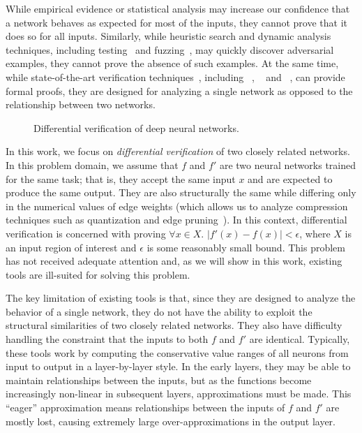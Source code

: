 While empirical evidence or statistical analysis may increase our
confidence that a network behaves as expected for most of the inputs,
they cannot prove that it does so for all inputs.
%
Similarly, while heuristic search and dynamic analysis techniques,
including testing~\cite{PeiCYJ17, TianPJR18, ma2018deepgauge} and
fuzzing~\cite{odena2018tensorfuzz, xie2019deephunter, xie2019diffchaser}, may quickly discover adversarial
examples, they cannot prove the absence of such examples.
%
At the same time, while state-of-the-art verification
techniques~\cite{HuangKWW17,Ehlers17,KatzHIJLLSTWZDK19,RuanHK18,WangPWYJ18nips,SinghGPV19iclr,MirmanGV18,GehrMDTCV18,FischerBDGZV19},
including \Reluplex{}~\cite{KatzBDJK17}, \ReluVal{}~\cite{WangPWYJ18}
and \DeepPoly{}~\cite{SinghGPV19}, can provide formal proofs, they are
designed for analyzing a single network as opposed to the relationship
between two networks.


\begin{figure}
\centering
\scalebox{1.0}{}
\caption{Differential verification of deep neural networks.}
\label{fig:subbed_nnets}
\end{figure}


In this work, we focus on \textit{differential verification} of two
closely related networks.  In this problem domain, we assume that
$ f $ and $ f' $ are two neural networks trained for the same task;
that is, they accept the same input $x$ and are expected to produce
the same output.  They are also structurally the same while differing
only in the numerical values of edge weights (which allows us to
analyze compression techniques such as quantization and edge pruning~\cite{HanMD16}).
%
In this context, differential verification is concerned with proving
 $\forall x \in X $. $ |f'(x) - f(x)| < \epsilon $, where $ X $
is an input region of interest and $ \epsilon $ is some reasonably
small bound.
%
This problem has not received adequate attention and, as we will show
in this work, existing tools are ill-suited for solving this problem.


The key limitation of existing tools is that, since they are designed
to analyze the behavior of a single network, they do not have the
ability to exploit the structural similarities of two closely related
networks.  They also have difficulty handling the constraint that the inputs
to both $ f $ and $ f' $ are identical.
%
Typically, these tools work by computing the conservative value ranges
of all neurons from input to output in a layer-by-layer style. In the
early layers, they may be able to maintain relationships between the
inputs, but as the functions become increasingly non-linear in
subsequent layers, approximations must be made.  This ``eager''
approximation means relationships between the inputs of $ f $ and $ f'
$ are mostly lost, causing extremely large over-approximations in
the output layer.


